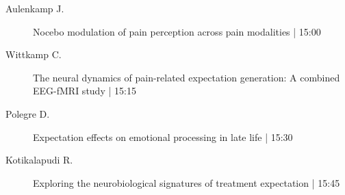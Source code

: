 \begin{symposium}
\begin{description}
                \item [ Aulenkamp J.] Nocebo modulation of pain perception across pain modalities \textcolor{mygray}{ | 15:00}    
                
                \item [ Wittkamp C.] The neural dynamics of pain-related expectation generation: A combined EEG-fMRI study \textcolor{mygray}{ | 15:15}    
                
                \item [ Polegre D.] Expectation effects on emotional processing in late life \textcolor{mygray}{ | 15:30}    
                
                \item [ Kotikalapudi R.] Exploring the neurobiological signatures of treatment expectation \textcolor{mygray}{ | 15:45}    
                
            \end{description} 
            \end{symposium}
            